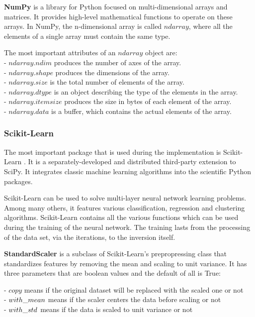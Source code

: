 \textbf{NumPy} is a library for Python focused on multi-dimensional arrays and matrices. It provides high-level mathematical functions to operate on these arrays. In NumPy, the n-dimensional array is called $ndarray$, where all the elements of a single array must contain the same type. \medskip

\noindent The most important attributes of an $ndarray$ object are:\\
- $ndarray.ndim$ produces the number of axes of the array.\\
- $ndarray.shape$ produces the dimensions of the array.\\
- $ndarray.size$ is the total number of elements of the array.\\
- $ndarray.dtype$ is an object describing the type of the elements in the array.\\
- $ndarray.itemsize$ produces the size in bytes of each element of the array.\\
- $ndarray.data$ is a buffer, which contains the actual elements of the array.


\subsubsection{Scikit-Learn}

The most important package that is used during the implementation is Scikit-Learn \cite{Pedregosa2011ScikitlearnML}. It is a separately-developed and distributed third-party extension to SciPy. It integrates classic machine learning algorithms into the scientific Python packages. \smallskip

Scikit-Learn can be used to solve multi-layer neural network learning problems. Among many others, it features various classification, regression and clustering algorithms. Scikit-Learn contains all the various functions which can be used during the training of the neural network. The training lasts from the processing of the data set, via the iterations, to the inversion itself. \bigskip

\textbf{StandardScaler} is a subclass of Scikit-Learn's prepropressing class that standardizes features by removing the mean and scaling to unit variance. It has three parameters that are boolean values and the default of all is True: \smallskip

\noindent - $copy$ means if the original dataset will be replaced with the scaled one or not\\
- $with\char`_mean$ means if the scaler centers the data before scaling or not\\
- $with\char`_std$ means if the data is scaled to unit variance or not \medskip


